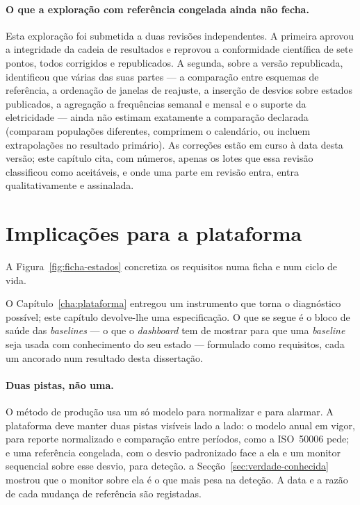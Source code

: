 \paragraph{O que a exploração com referência congelada ainda não fecha.}
Esta exploração foi submetida a duas revisões independentes. A primeira
aprovou a integridade da cadeia de resultados e reprovou a conformidade
científica de sete pontos, todos corrigidos e republicados. A segunda,
sobre a versão republicada, identificou que várias das suas partes --- a
comparação entre esquemas de referência, a ordenação de janelas de
reajuste, a inserção de desvios sobre estados publicados, a agregação a
frequências semanal e mensal e o suporte da eletricidade --- ainda não
estimam exatamente a comparação declarada (comparam populações diferentes,
comprimem o calendário, ou incluem extrapolações no resultado primário). As
correções estão em curso à data desta versão; este capítulo cita, com
números, apenas os lotes que essa revisão classificou como aceitáveis, e
onde uma parte em revisão entra, entra qualitativamente e assinalada.

\section{Implicações para a plataforma}
\label{sec:implicacoes-plataforma}
A Figura~\ref{fig:ficha-estados} concretiza os requisitos numa ficha e num ciclo de vida.



O Capítulo~\ref{cha:plataforma} entregou um instrumento que torna o
diagnóstico possível; este capítulo devolve-lhe uma especificação. O que se
segue é o bloco de saúde das \emph{baselines} --- o que o \emph{dashboard}
tem de mostrar para que uma \emph{baseline} seja usada com conhecimento do
seu estado --- formulado como requisitos, cada um ancorado num resultado
desta dissertação.

\paragraph{Duas pistas, não uma.} O método de produção usa um só modelo para
normalizar e para alarmar. A plataforma deve manter duas pistas visíveis
lado a lado: o modelo anual em vigor, para reporte normalizado e comparação
entre períodos, como a ISO~50006 pede; e uma referência congelada, com o
desvio padronizado face a ela e um monitor sequencial sobre esse desvio,
para deteção.  a Secção~\ref{sec:verdade-conhecida} mostrou que o monitor
sobre ela é o que mais pesa na deteção. A data e a razão de cada mudança de
referência são registadas.


